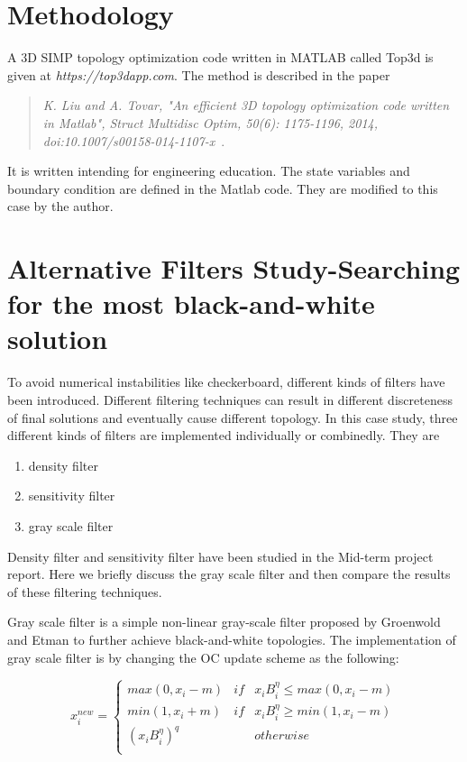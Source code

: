 \documentclass{article}
\begin{document}
\section{Methodology}

A 3D SIMP topology optimization code written in MATLAB called Top3d is given at \emph{https://top3dapp.com}. The method is described  in the paper
\begin{quote} 
\textit{K. Liu and A. Tovar, "An efficient 3D topology optimization code written in Matlab", Struct Multidisc Optim, 50(6): 1175-1196, 2014, doi:10.1007/s00158-014-1107-x}~\cite{liu2014efficient}.
\end{quote}
It is written intending for engineering education. The state variables and boundary condition are defined in the Matlab code. They are modified to this case by the author. 



\section{Alternative Filters Study-Searching for the most black-and-white solution}
To avoid numerical instabilities like checkerboard, different kinds of filters have been introduced. Different filtering techniques can result in different discreteness of final solutions and eventually cause different topology. In this case study, three different kinds of filters are implemented individually or combinedly. They are 
\begin{enumerate} 
\item{density filter} 
\item{sensitivity filter} 
\item{gray scale filter} 
\end{enumerate} 

Density filter and sensitivity filter have been studied in the Mid-term project report. Here we briefly discuss the gray scale filter and then compare the results of these filtering techniques.

Gray scale filter is a simple non-linear gray-scale filter proposed by Groenwold and Etman \cite{groenwold2009} to further achieve black-and-white topologies. The implementation of gray scale filter is by changing the OC update scheme as the following:

$$ x_i^{new}=\left\{
\begin{array}{rlc}
max(0,x_i-m) & if & {x_iB_i^\eta\leq max(0,x_i-m)}\\
min(1,x_i+m) & if & {x_iB_i^\eta\geq min(1,x_i-m)}\\
(x_iB_i^\eta)^q & &{otherwise}\\
\end{array} \right. $$
\end{document}
